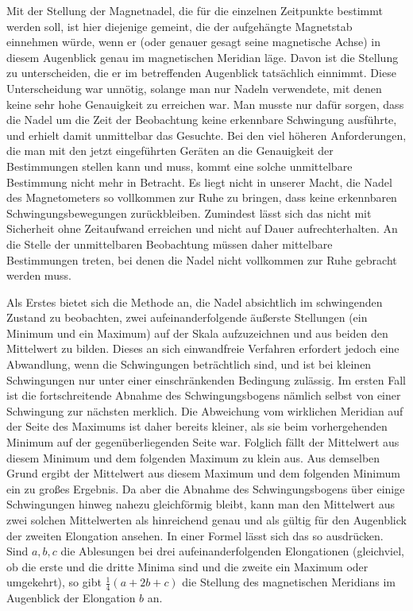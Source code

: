 Mit der Stellung der Magnetnadel, die für die einzelnen Zeitpunkte bestimmt werden soll, ist hier diejenige gemeint, die der aufgehängte Magnetstab einnehmen würde, wenn er (oder genauer gesagt seine magnetische Achse) in diesem Augenblick genau im magnetischen Meridian läge. Davon ist die Stellung zu unterscheiden, die er im betreffenden Augenblick tatsächlich einnimmt. Diese Unterscheidung war unnötig, solange man nur Nadeln verwendete, mit denen keine sehr hohe Genauigkeit zu erreichen war. Man musste nur dafür sorgen, dass die Nadel um die Zeit der Beobachtung keine erkennbare Schwingung ausführte, und erhielt damit unmittelbar das Gesuchte. Bei den viel höheren Anforderungen, die man mit den jetzt eingeführten Geräten an die Genauigkeit der Bestimmungen stellen kann und muss, kommt eine solche unmittelbare Bestimmung nicht mehr in Betracht. Es liegt nicht in unserer Macht, die Nadel des Magnetometers so vollkommen zur Ruhe zu bringen, dass keine erkennbaren Schwingungsbewegungen zurückbleiben. Zumindest lässt sich das nicht mit Sicherheit ohne Zeitaufwand erreichen und nicht auf Dauer aufrechterhalten. An die Stelle der unmittelbaren Beobachtung müssen daher mittelbare Bestimmungen treten, bei denen die Nadel nicht vollkommen zur Ruhe gebracht werden muss.

Als Erstes bietet sich die Methode an, die Nadel absichtlich im schwingenden Zustand zu beobachten, zwei aufeinanderfolgende äußerste Stellungen (ein Minimum und ein Maximum) auf der Skala aufzuzeichnen und aus beiden den Mittelwert zu bilden. Dieses an sich einwandfreie Verfahren erfordert jedoch eine Abwandlung, wenn die Schwingungen beträchtlich sind, und ist bei kleinen Schwingungen nur unter einer einschränkenden Bedingung zulässig. Im ersten Fall ist die fortschreitende Abnahme des Schwingungsbogens nämlich selbst von einer Schwingung zur nächsten merklich. Die Abweichung vom wirklichen Meridian auf der Seite des Maximums ist daher bereits kleiner, als sie beim vorhergehenden Minimum auf der gegenüberliegenden Seite war. Folglich fällt der Mittelwert aus diesem Minimum und dem folgenden Maximum zu klein aus. Aus demselben Grund ergibt der Mittelwert aus diesem Maximum und dem folgenden Minimum ein zu großes Ergebnis. Da aber die Abnahme des Schwingungsbogens über einige Schwingungen hinweg nahezu gleichförmig bleibt, kann man den Mittelwert aus zwei solchen Mittelwerten als hinreichend genau und als gültig für den Augenblick der zweiten Elongation ansehen. In einer Formel lässt sich das so ausdrücken. Sind $a,b,c$ die Ablesungen bei drei aufeinanderfolgenden Elongationen (gleichviel, ob die erste und die dritte Minima sind und die zweite ein Maximum oder umgekehrt), so gibt $\tfrac14(a+2b+c)$ die Stellung des magnetischen Meridians im Augenblick der Elongation $b$ an.

